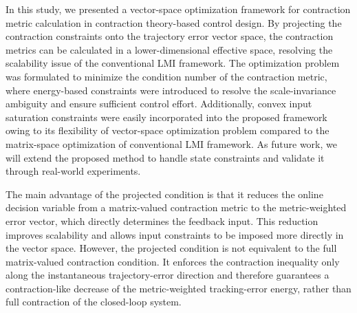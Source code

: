 \documentclass{ifacconf}
\begin{document}
In this study, we presented a vector-space optimization framework for contraction metric calculation in contraction theory-based control design.
By projecting the contraction constraints onto the trajectory error vector space, the contraction metrics can be calculated in a lower-dimensional effective space, resolving the scalability issue of the conventional LMI framework.
The optimization problem was formulated to minimize the condition number of the contraction metric, where energy-based constraints were introduced to resolve the scale-invariance ambiguity and ensure sufficient control effort. 
Additionally, convex input saturation constraints were easily incorporated into the proposed framework owing to its flexibility of vector-space optimization problem compared to the matrix-space optimization of conventional LMI framework.
As future work, we will extend the proposed method to handle state constraints and validate it through real-world experiments.

The main advantage of the projected condition is that it reduces the online decision variable from a matrix-valued contraction metric to the metric-weighted error vector, which directly determines the feedback input. This reduction improves scalability and allows input constraints to be imposed more directly in the vector space. However, the projected condition is not equivalent to the full matrix-valued contraction condition. It enforces the contraction inequality only along the instantaneous trajectory-error direction and therefore guarantees a contraction-like decrease of the metric-weighted tracking-error energy, rather than full contraction of the closed-loop system.


\end{document}
